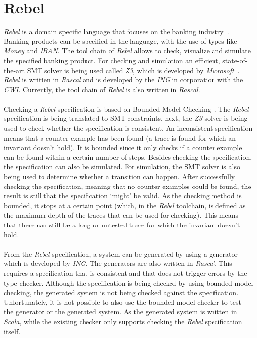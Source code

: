 \section{Rebel}
\textit{Rebel} is a domain specific language that focuses on the banking
industry~\cite{stoel2016solving}. Banking products can be specified in the
language, with the use of types like \textit{Money} and \textit{IBAN}. The tool
chain of \textit{Rebel} allows to check, visualize and simulate the specified
banking product. For checking and simulation an efficient, state-of-the-art SMT
solver is being used called \textit{Z3}, which is developed by
\textit{Microsoft}~\cite{de2008z3}. \textit{Rebel} is written in \textit{Rascal}
and is developed by the \textit{ING} in corporation with the \textit{CWI}.
Currently, the tool chain of \textit{Rebel} is also written in
\textit{Rascal}.\\
\\
Checking a \textit{Rebel} specification is based on Bounded Model
Checking~\cite{stoel2016solving}. The \textit{Rebel} specification is being
translated to SMT constraints, next, the \textit{Z3} solver is being used to
check whether the specification is consistent. An inconsistent specification
means that a counter example has been found (a trace is found for which an
invariant doesn't hold). It is bounded since it only checks if a counter example
can be found within a certain number of steps. Besides checking the
specification, the specification can also be simulated. For simulation, the SMT
solver is also being used to determine whether a transition can happen. After
successfully checking the specification, meaning that no counter examples could
be found, the result is still that the specification `might' be valid. As the
checking method is bounded, it stops at a certain point (which, in the
\textit{Rebel} toolchain, is defined as the maximum depth of the traces that can
be used for checking). This means that there can still be a long or untested
trace for which the invariant doesn't hold.\\
\\
From the \textit{Rebel} specification, a system can be generated by using a
generator which is developed by \textit{ING}. The generators are also written in
\textit{Rascal}. This requires a specification that is consistent and that does
not trigger errors by the type checker. Although the specification is being
checked by using bounded model checking, the generated system is not being
checked against the specification. Unfortunately, it is not possible to also use
the bounded model checker to test the generator or the generated system. As the
generated system is written in \textit{Scala}, while the existing checker only
supports checking the \textit{Rebel} specification itself.

